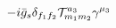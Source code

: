 %
\begin{dmath*}
%
  -  i {\bar g}_s\delta_{f_1 f_2} {\cal T}_{m_1 m_2}^{a_3} \gamma^{\mu_3}
%
\end{dmath*}
%
